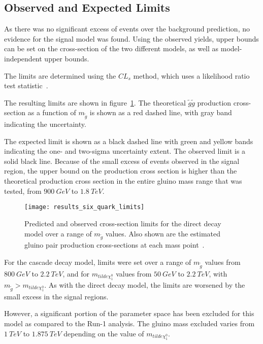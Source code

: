 \subsection{Observed and Expected Limits}\label{subsec:results_limits}

As there was no significant excess of events over the background prediction, no evidence for the signal model was found.
Using the observed yields, upper bounds can be set on the cross-section of the two different
models, as well as model-independent upper bounds.

The limits are determined using the $CL_s$ method, which uses a likelihood ratio test statistic~\cite{results-stats-cls}.

The resulting limits are shown in figure~\ref{fig:results_six_quark_limits}.
The theoretical $\tilde{g}\tilde{g}$ production cross-section as a function of $m_{\tilde{g}}$ is shown as a red dashed
line, with gray band indicating the uncertainty.

The expected limit is shown as a black dashed line with green and yellow bands indicating the one- and two-sigma uncertainty extent.
The observed limit is a solid black line.
Because of the small excess of events observed in the signal region, the upper bound on the production cross section
is higher than the theoretical production cross section in the entire gluino mass range that was tested,
from $900~GeV$ to $1.8~TeV$.

\begin{figure}[!ht]
    \centering
    \texttt{[image: results\_six\_quark\_limits]}
    \caption{Predicted and observed cross-section limits for the direct decay model over a range of $m_{\tilde{g}}$ values.
    Also shown are the estimated gluino pair production cross-sections at each mass point~\cite{paper-plb}.}
\label{fig:results_six_quark_limits}
\end{figure}

For the cascade decay model, limits were set over a range of $m_{\tilde{g}}$ values from $800~GeV$ to $2.2~TeV$,
and for $m_{tilde{\chi}_1^0}$ values from $50~GeV$ to $2.2~TeV$, with $m_{\tilde{g}} > m_{tilde{\chi}_1^0}$.
As with the direct decay model, the limits are worsened by the small excess in the signal regions.

However, a significant portion of the parameter space has been excluded for this model as compared to the Run-1 analysis.
The gluino mass excluded varies from $1~TeV$ to $1.875~TeV$ depending on the value of $m_{tilde{\chi}_1^0}$.


